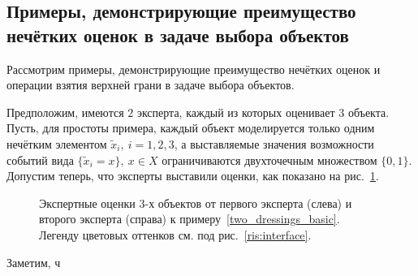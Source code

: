 \subsection{Примеры, демонстрирующие преимущество нечётких оценок в задаче выбора объектов}

Рассмотрим примеры, демонстрирующие преимущество нечётких оценок и операции взятия верхней грани в задаче выбора объектов. 
\begin{example}
\label{two_dressings_basic}
Предположим, имеются $2$ эксперта, каждый из которых оценивает $3$ объекта. Пусть, для простоты примера, каждый объект моделируется только одним нечётким элементом $\tilde x_i,\ i=1,2,3$, а выставляемые значения возможности событий вида  $\{\tilde x_i = x\},\ x \in X$ ограничиваются двухточечным множеством $\{0, 1\}$. Допустим теперь, что эксперты выставили оценки, как показано на рис.~\ref{two_dressings_source}.
\end{example}

\begin{figure}[h]
\caption{\small Экспертные оценки $3$-х объектов от первого эксперта (слева) и второго эксперта (справа) к примеру~\ref{two_dressings_basic}. Легенду цветовых оттенков см. под рис.~\ref{ris:interface}. }
\label{two_dressings_source}
\end{figure}

Заметим, ч

